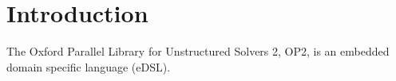 \chapter{Introduction}






The Oxford Parallel Library for Unstructured Solvers 2, OP2, is an embedded domain specific language (eDSL). 








